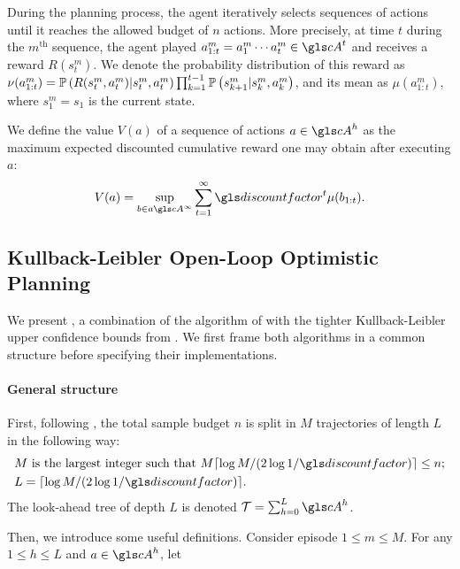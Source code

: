 During the planning process, the agent iteratively selects sequences of actions until it reaches the allowed budget of $n$ actions. More precisely, at time $t$ during the $m^{\text{th}}$ sequence, the agent played $a^m_{1:t} = a^m_1 \cdots a^m_t \in \cA^t$ and receives a reward $R(s_t^m)$. We denote the probability distribution of this reward as $\nu(a_{1:t}^m) = \mathbb{P}\left(R(s_t^m, a_t^m) | s_t^m, a_t^m\right) \prod_{k=1}^{t-1} \mathbb{P}\left(s_{k+1}^m | s_{k}^m, a_{k}^m\right)$, and its mean as $\mu(a_{1:t}^m)$, where $s_1^m=s_1$ is the current state.


\begin{definition}
	\begin{leftbar}[defnbar]
	\label{def:sequence-values}
	We define the value $V(a)$ of a sequence of actions $a\in \cA^h$ as the maximum expected discounted cumulative reward one may obtain after executing $a$:
	\begin{equation}
	\label{eq:value}
	V(a) = \sup_{b\in a\cA^\infty} \sum_{t=1}^\infty \discount^t\mu(b_{1:t}).
	\end{equation}
	\end{leftbar}
\end{definition}


\subsection{Kullback-Leibler Open-Loop Optimistic Planning}
\label{sec:kl-olop}

We present \KLOLOP, a combination of the \OLOP algorithm of \citep{Bubeck2010} with the tighter Kullback-Leibler upper confidence bounds from \citep{Cappe2013}. We first frame both algorithms in a common structure before specifying their implementations.

\paragraph{General structure}

First, following \OLOP, the total sample budget $n$ is split in $M$ trajectories of length $L$ in the following way: 
\begin{align*}
&M\text{ is the largest integer such that } M \ceil{\log M/(2 \log 1/\discount)} \leq n;\\
&L= \ceil{\log M / (2 \log 1/\discount)}.
\end{align*}
The look-ahead tree of depth $L$ is denoted $\Tau = \sum_{h=0}^L \cA^h$.

Then, we introduce some useful definitions. Consider episode $1 \leq m \leq M$. For any $1 \leq h \leq L$ and $a\in \cA^h$, let 


